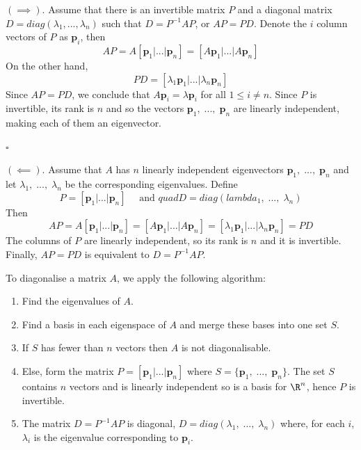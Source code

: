 \newpage\noindent{}
{\((\implies).\) Assume that there is an invertible matrix \(P\) and a diagonal matrix \(D = diag(\lambda_1,...,\lambda_n)\) such that \(D=P^{-1}AP\), or \(AP=PD\). Denote the \(i\) column vectors of \(P\) as \(\mathbf{p}_i\), then
\begin{equation}
    AP = A[\mathbf{p}_1|...|\mathbf{p}_n] = [A\mathbf{p}_1|...|A\mathbf{p}_n]
\end{equation}
On the other hand, 
\begin{equation}
    PD = [\lambda_1\mathbf{p}_1|...|\lambda_n\mathbf{p}_n]
\end{equation}
Since \(AP=PD\), we conclude that \(A\mathbf{p}_i = \lambda\mathbf{p}_i\) for all \(1 \leq i \neq n\). Since \(P\) is invertible, its rank is \(n\) and so the vectors \(\mathbf{p}_1,\;...,\;\mathbf{p}_n\) are linearly independent, making each of them an eigenvector.\begin{flushright}\(\square\)\end{flushright}

\((\impliedby).\) Assume that \(A\) has \(n\) linearly independent eigenvectors \(\mathbf{p}_1,\;...,\;\mathbf{p}_n\) and let \(\lambda_1,\;...,\;\lambda_n\) be the corresponding eigenvalues. Define
\begin{equation}
    P = [\mathbf{p}_1|...|\mathbf{p}_n] \quad\text{ and }quad D = diag(lambda_1,\;...,\;\lambda_n)
\end{equation}
Then
\begin{equation}
    AP = A[\mathbf{p}_1|...|\mathbf{p}_n] = [A\mathbf{p}_1|...|A\mathbf{p}_n] = [\lambda_1\mathbf{p}_1|...|\lambda_n\mathbf{p}_n] = PD
\end{equation}
The columns of \(P\) are linearly independent, so its rank is \(n\) and it is invertible. Finally, \(AP=PD\) is equivalent to \(D=P^{-1}AP\).}

To diagonalise a matrix \(A\), we apply the following algorithm:
\begin{enumerate}
    \item Find the eigenvalues of \(A\).
    \item Find a basis in each eigenspace of \(A\) and merge these bases into one set \(S\).
    \item If \(S\) has fewer than \(n\) vectors then \(A\) is not diagonalisable.
    \item Else, form the matrix \(P = [\mathbf{p}_1|...|\mathbf{p}_n]\) where \(S = \{\mathbf{p}_1,\;...,\;\mathbf{p}_n\}\). The set \(S\) contains \(n\) vectors and is linearly independent so is a basis for \(\R^n\), hence \(P\) is invertible.
    \item The matrix \(D=P^{-1}AP\) is diagonal, \(D=diag(\lambda_1,\;...,\;\lambda_n)\) where, for each \(i\), \(\lambda_i\) is the eigenvalue corresponding to \(\mathbf{p}_i\).
\end{enumerate}

